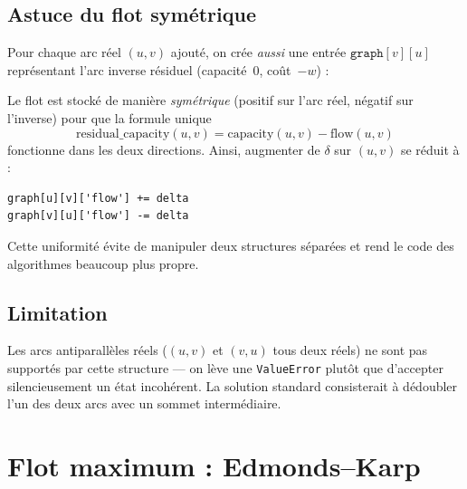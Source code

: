 \documentclass[11pt,a4paper]{article}
\begin{document}
\subsection{Astuce du flot symétrique}

Pour chaque arc réel $(u, v)$ ajouté, on crée \emph{aussi} une entrée
$\texttt{graph}[v][u]$ représentant l'arc inverse résiduel (capacité~$0$,
coût~$-w$) :

\begin{center}
\end{center}

Le flot est stocké de manière \emph{symétrique} (positif sur l'arc réel,
négatif sur l'inverse) pour que la formule unique
\[
    \text{residual\_capacity}(u, v) = \text{capacity}(u, v) - \text{flow}(u, v)
\]
fonctionne dans les deux directions. Ainsi, augmenter de $\delta$ sur
$(u, v)$ se réduit à :
\begin{lstlisting}
graph[u][v]['flow'] += delta
graph[v][u]['flow'] -= delta
\end{lstlisting}
Cette uniformité évite de manipuler deux structures séparées et rend le
code des algorithmes beaucoup plus propre.

\subsection{Limitation}

Les arcs antiparallèles réels ($(u,v)$ et $(v,u)$ tous deux réels) ne sont
pas supportés par cette structure --- on lève une \texttt{ValueError}
plutôt que d'accepter silencieusement un état incohérent. La solution
standard consisterait à dédoubler l'un des deux arcs avec un sommet
intermédiaire.

\section{Flot maximum : Edmonds--Karp}
\label{sec:ff}
\end{document}
